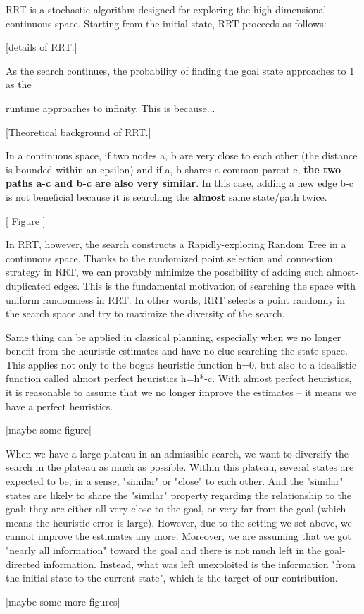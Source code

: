 
RRT is a stochastic algorithm designed for exploring the high-dimensional continuous space.
Starting from the initial state, RRT proceeds as follows:

[details of RRT.]

As the search continues, the probability of finding the goal state approaches to 1 as the

runtime approaches to infinity. This is because...


[Theoretical background of RRT.]

In a continuous space,
if two nodes a, b are very close to each other (the distance is bounded within an epsilon)
and if a, b shares a common parent c,
\textbf{the two paths a-c and b-c are also very similar}.
In this case, adding a new edge b-c is
not beneficial because it is searching the \textbf{almost} same state/path twice.

[ Figure ]

In RRT, however, the search constructs a Rapidly-exploring Random Tree in a continuous space.
Thanks to the randomized point selection and connection strategy in RRT,
we can provably minimize the possibility of adding such almost-duplicated edges.
This is the fundamental motivation of searching the space with uniform randomness in RRT.
In other words, RRT selects a point randomly in the search space and
try to maximize the diversity of the search.


Same thing can be applied in classical planning, especially when we no
longer benefit from the heuristic estimates and have no clue searching the
state space.
This applies not only to the bogus heuristic function h=0, but also to a idealistic
function called almost perfect heuristics h=h*-c. With almost perfect
heuristics, it is reasonable to assume that we no longer improve the
estimates -- it means we have a perfect heuristics.

[maybe some figure]

When we have a large plateau in an admissible search,
we want to diversify the search in the plateau as much as possible.
Within this plateau, several states are expected to be, in a sense,
"similar" or "close" to each other. And the "similar" states are likely to
share the "similar" property regarding the relationship to the goal:
they are either all very close to the goal, or very far from the goal (which means
the heuristic error is large). However, due to the setting we set
above, we cannot improve the estimates any more. Moreover, we are assuming
that we got "nearly all information" toward the goal and there is not much
left in the goal-directed information.
Instead, what was left unexploited is the information "from the initial state to the
current state", which is the target of our contribution.

[maybe some more figures]
